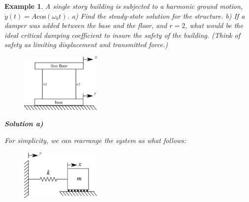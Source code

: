 \documentclass[12pt,letter]{article}
\newtheorem{ex}{Example}
\numberwithin{ex}{section} %
\newenvironment{example}{\begin{mdframed}[middlelinewidth=0.5mm]\begin{ex}\normalfont}{\end{ex}\end{mdframed}}
\begin{document}
\begin{example}
	
			A single story building is subjected to a harmonic ground motion, $\ddot{y}(t) = A \text{cos}(\omega_b t)$. a) Find the steady-state solution for the structure.  b) If a damper was added between the base and the floor, and $r=2$, what would be the ideal critical damping coefficient to insure the safety of the building. (Think of safety as limiting displacement and transmitted force.) 
			\begin{figure}[H]
				\centering
				\includegraphics[width=0.35\textwidth]{../Figures/base_excited_structure.png}
			\end{figure}				
						
			\textbf{Solution a)}
				
			For simplicity, we can rearrange the system as what follows:
			\begin{figure}[H]
				\centering
				\includegraphics[width=0.35\textwidth]{../Figures/base_excited_structure_simple.png}
			\end{figure}			


\end{example}
\end{document}
